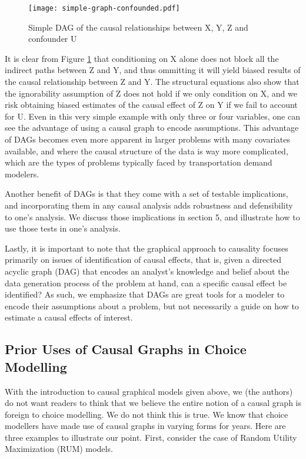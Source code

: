 \begin{figure}[h!]
   \centering
   \texttt{[image: simple-graph-confounded.pdf]}
   \caption{Simple DAG of the causal relationships between X, Y, Z and confounder U}
   \label{fig:simple-graph-confounded}
\end{figure}

It is clear from Figure \ref{fig:simple-graph-confounded} that conditioning on X alone does not block all the indirect paths between Z and Y, and thus ommitting it will yield biased results of the causal relationship between Z and Y. 
The structural equations also show that the ignorability assumption 
of Z does not hold if we only condition on X, and we risk obtaining biased estimates of the causal effect of Z on Y if we fail to 
account for U. 
Even in this very simple example with only three or four variables, one can see the advantage of using a causal graph to encode assumptions. 
This advantage of DAGs becomes even more apparent in larger problems with many covariates available, and where the causal structure of the data is way more complicated, which are the types of problems typically faced by transportation demand modelers. 

Another benefit of DAGs is that they come with a set of testable implications, and incorporating them in any causal 
analysis adds robustness and defensibility to one's analysis. 
We discuss those implications in section 5, and illustrate how to use those tests in one's analysis.

Lastly, it is important to note that the graphical approach to causality focuses 
primarily on issues of identification of causal effects, that is, given a 
directed acyclic graph (DAG) that encodes an analyst's knowledge and belief 
about the data generation process of the problem at hand, can a specific 
causal effect be identified? 
As such, we emphasize that DAGs are great tools 
for a modeler to encode their assumptions about a problem, but not necessarily 
a guide on how to estimate a causal effects of interest. 

\subsection{Prior Uses of Causal Graphs in Choice Modelling}
\label{sec:choice-graphs}

With the introduction to causal graphical models given above, we (the authors) do not want readers to think that we believe the entire notion of a causal graph is foreign to choice modelling.
We do not think this is true.
We know that choice modellers have made use of causal graphs in varying forms for years.
Here are three examples to illustrate our point.
First, consider the case of Random Utility Maximization (RUM) models.


